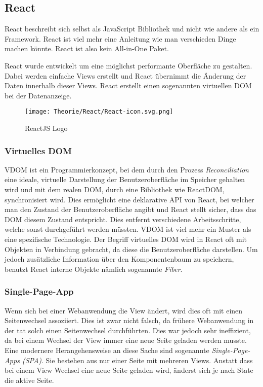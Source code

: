 \subsection{React}
\label{reactjs}
React beschreibt sich selbst als JavaScript Bibliothek und nicht wie andere als 
ein Framework. React ist viel mehr eine Anleitung wie man verschieden Dinge machen könnte.
React ist also kein All-in-One Paket.


React wurde entwickelt um eine möglichst performante Oberfläche zu gestalten. Dabei werden 
einfache Views erstellt und React übernimmt die Änderung der Daten innerhalb dieser Views. React 
erstellt einen sogenannten virtuellen DOM bei der Datenanzeige.

\begin{figure}[H]
  \begin{center}
    \texttt{[image: Theorie/React/React-icon.svg.png]}
    \caption{ReactJS Logo~\cite{reactjs}}
  \end{center}
\end{figure}

\subsubsection{Virtuelles DOM}
VDOM ist ein Programmierkonzept, bei dem durch den Prozess \textit{Reconciliation} eine ideale, 
virtuelle Darstellung der Benutzeroberfläche im Speicher gehalten wird und mit dem realen DOM, durch 
eine Bibliothek wie ReactDOM, synchronisiert wird. Dies ermöglicht eine deklarative API von React, 
bei welcher man den Zustand der Benutzeroberfläche angibt und React stellt sicher, dass das DOM diesem 
Zustand entspricht. Dies entfernt verschiedene Arbeitsschritte, welche sonst durchgeführt werden müssten.
VDOM ist viel mehr ein Muster als eine spezifische Technologie. Der Begriff virtuelles DOM wird in 
React oft mit Objekten in Verbindung gebracht, da diese die Benutzeroberfläche darstellen. Um jedoch 
zusätzliche Information über den Komponentenbaum zu speichern, benutzt React interne 
Objekte nämlich sogenannte \textit{Fiber}.\cite{DOM}

\subsubsection{Single-Page-App}
\label{singlePageApp}
Wenn sich bei einer Webanwendung die View ändert, wird dies oft mit einen Seitenwechsel 
assoziiert. Dies ist zwar nicht falsch, da frühere Webanwendung in der tat solch einen Seitenwechsel 
durchführten. Dies war jedoch sehr ineffizient, da bei einem Wechsel der View immer eine neue Seite 
geladen werden musste. Eine modernere Herangehensweise an diese Sache sind sogenannte
\textit{Single-Page-Apps (SPA)}. Sie bestehen aus nur einer Seite mit mehreren Views. Anstatt dass 
bei einem View Wechsel eine neue Seite geladen wird, änderst sich je nach State die aktive Seite.
~\cite{SPA}


